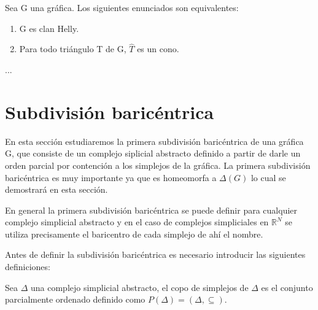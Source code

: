  
\begin{Teo}
Sea G una gráfica. Los siguientes enunciados son equivalentes:
\begin{enumerate}
\item G es clan Helly.
\item Para todo triángulo T de G, $\hat{T}$ es un cono.
\end{enumerate}
\end{Teo}
\begin{Dem}
...
\end{Dem}
\section{Subdivisión baricéntrica}
En esta sección estudiaremos la primera subdivisión baricéntrica de una gráfica G, que consiste de un complejo siplicial abstracto definido a partir de darle un orden parcial por contención a los simplejos de la gráfica. La primera subdivisión baricéntrica es muy importante ya que es homeomorfa a $\Delta(G)$ lo cual se demostrará en esta sección.

En general la primera subdivisión baricéntrica se puede definir para cualquier complejo simplicial abstracto y en el caso de complejos simpliciales en $\mathbb{R}^N$ se utiliza precisamente el baricentro de cada simplejo de ahí el nombre.

Antes de definir la subdivisión baricéntrica es necesario introducir las siguientes definiciones:

\begin{Defi}
Sea $\Delta$ una complejo simplicial abstracto, el copo de simplejos de $\Delta$ es el conjunto parcialmente ordenado definido como $P(\Delta) = (\Delta,\subseteq)$. 
\end{Defi}


